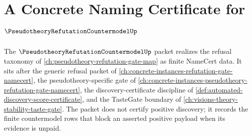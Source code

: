 \chapter{A Concrete Naming Certificate for $\PseudotheoryRefutationCountermodelUp$}
\label{ch:concrete-instances-pseudotheory-refutation-countermodel-namecert}

The $\PseudotheoryRefutationCountermodelUp$ packet realizes the refusal
taxonomy of \autoref{ch:pseudotheory-refutation-gate-map} as finite NameCert
data. It sits after the generic refusal packet of
\autoref{ch:concrete-instances-refutation-gate-namecert}, the
pseudotheory-specific gate of
\autoref{ch:concrete-instances-pseudotheory-refutation-gate-namecert}, the
discovery-certificate discipline of
\autoref{def:automated-discovery-score-certificate}, and the TasteGate boundary
of \autoref{ch:visions-theory-stability-taste-gate}. The packet does not
certify positive discovery; it records the finite countermodel rows that block
an asserted positive payload when its evidence is unpaid.


